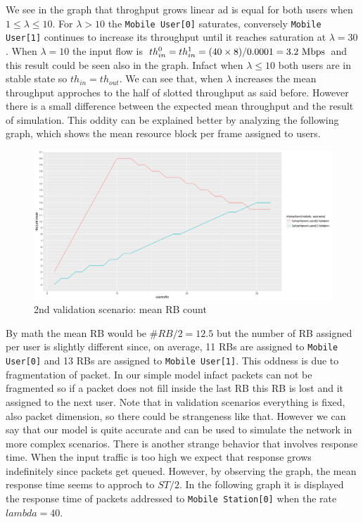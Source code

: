 We see in the graph that throghput grows linear ad is equal for both users when \(1 \leq \lambda \leq 10 \). For \(\lambda > 10 \) the \texttt{Mobile User[0]} saturates, conversely \texttt{Mobile User[1]} continues to increase its throughput until it reaches saturation at \(\lambda = 30\).
When \(\lambda = 10 \) the input flow is \(th_{in}^{0} = th_{in}^{1} = (40 \times 8)/0.0001 = 3.2\textnormal{ Mbps}\) and this result could be seen also in the graph. Infact when \(\lambda \le 10 \) both users are in stable state so \(th_{in} = th_{out}\). We can see that, when \(\lambda\) increases the mean throughput approches to the half of slotted throughput as said before. However there is a small difference between the expected mean throughput and the result of simulation. This oddity can be explained better by analyzing the following graph, which shows the mean resource block per frame assigned to users.
\begin{figure}[H]
  \includegraphics[width=1\textwidth]{images/RBCompvalidation2}
  \caption{2nd validation scenario: mean RB count}
  \label{fig:2nd validation scenario: mean RB count}
\end{figure}
By math the mean RB would be \(\#RB / 2 = 12.5 \) but the number of RB assigned per user is slightly different since, on average, 11 RBs are assigned to \texttt{Mobile User[0]} and 13 RBs are assigned to \texttt{Mobile User[1]}. This oddness is due to fragmentation of packet. In our simple model infact packets can not be fragmented so if a packet does not fill inside the last RB this RB is lost and it assigned to the next user. Note that in validation scenarios everything is fixed, also packet dimension, so there could be strangeness like that. However we can say that our model is quite accurate and can be used to simulate the network in more complex scenarios. 
There is another strange behavior that involves response time. When the input traffic is too high we expect that response grows indefinitely since packets get queued. However, by observing the graph, the mean response time seems to approch to \(ST/2\). In the following graph it is displayed the response time of packets addressed to \texttt{Mobile Station[0]} when the rate \(lambda = 40\).
